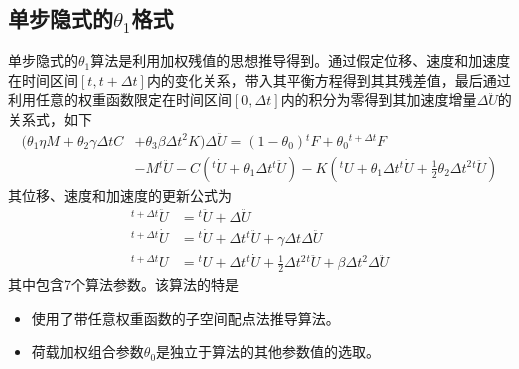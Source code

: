 \subsection{单步隐式的$\theta_1$格式}
单步隐式的$\theta_1$算法\cite{Hoff1988}是利用加权残值的思想推导得到。通过假定位移、速度和加速度在时间区间$[t,t+\Delta t]$内的变化关系，带入其平衡方程得到其其残差值，最后通过利用任意的权重函数限定在时间区间$[0,\Delta t]$内的积分为零得到其加速度增量$\Delta\ddot{U}$的关系式，如下
\begin{equation}
\begin{aligned}
(\theta_1\eta M+\theta_2\gamma\Delta tC&+\theta_3\beta\Delta t^2K)\Delta\ddot{U}=(1-\theta_0){^t\!F}+\theta_0{^{t+\Delta t}\!F}\\
&-M{^{t}\!\ddot{U}}-C({^t\!\dot{U}}+\theta_1\Delta t{^t\!\ddot{U}})-K({^t\!U}+\theta_1\Delta t{^t\!\dot{U}}+\frac{1}{2}\theta_2\Delta t^2{^t\!\ddot{U}})
\end{aligned}
\end{equation}
其位移、速度和加速度的更新公式为
\begin{align}
{^{t+\Delta t}\!\ddot{U}}&={^t\!\ddot{U}}+\Delta \ddot{U}\\
{^{t+\Delta t}\!\dot{U}}&={^t\!\dot{U}}+\Delta t{^t\!\ddot{U}}+\gamma\Delta t\Delta\ddot{U}\\
{^{t+\Delta t}\!U}&={^t\!U}+\Delta t{^t\!\dot{U}}+\frac12\Delta t^2{^t\!\ddot{U}}+\beta\Delta t^2\Delta\ddot{U}
\end{align}
其中包含7个算法参数。该算法的特是
\begin{itemize}
\item[\ddag] 使用了带任意权重函数的子空间配点法推导算法。
\item[\ddag] 荷载加权组合参数$\theta_0$是独立于算法的其他参数值的选取。
\end{itemize}

